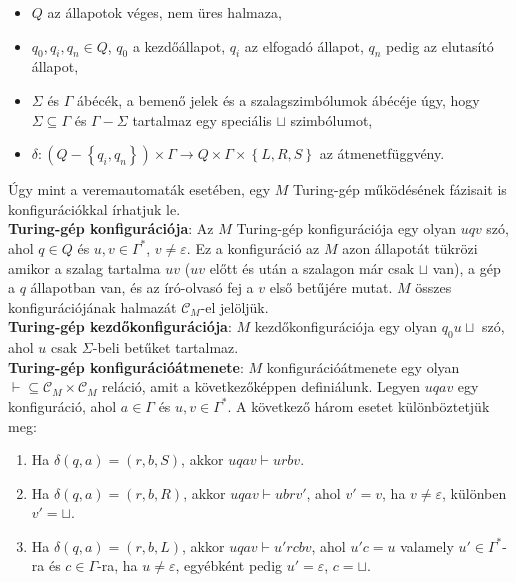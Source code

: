\documentclass[margin=0px]{article}
\begin{document}
	\begin{itemize}
		
		\item	$Q$ az állapotok véges, nem üres halmaza,
		
		\item	$q_{0}, q_{i}, q_{n} \in Q$, $q_{0}$ a kezdőállapot, $q_{i}$ az elfogadó állapot,
		$q_{n}$ pedig az elutasító állapot,
		
		\item	$\Sigma$ és $\Gamma$ ábécék, a bemenő jelek és a szalagszimbólumok ábécéje úgy, hogy
		$\Sigma \subseteq \Gamma$ és $\Gamma - \Sigma$ tartalmaz egy speciális $\sqcup$ szimbólumot,
		
		\item	$\delta : (Q - \left\{q_{i},q_{n}\right\}) \times \Gamma \to Q \times \Gamma \times \left\{L, R, S\right\}$
		az átmenetfüggvény.

	\end{itemize}
	
	Úgy mint a veremautomaták esetében, egy $M$ Turing-gép működésének fázisait	is konfigurációkkal írhatjuk le.\\
	
	\noindent \textbf{Turing-gép konfigurációja}: Az $M$ Turing-gép konfigurációja egy olyan $uqv$ szó, ahol
	$q \in Q$ és $u, v \in \Gamma^{*}$, $v \not = \varepsilon$. Ez a konfiguráció az $M$ azon állapotát tükrözi
	amikor a szalag tartalma $uv$ ($uv$ előtt és után a szalagon már csak $\sqcup$ van), a gép a $q$ állapotban van,
	és az író-olvasó fej a $v$ első betűjére mutat. $M$ összes konfigurációjának halmazát $\mathcal{C}_{M}$-el jelöljük.\\
	
	\noindent \textbf{Turing-gép kezdőkonfigurációja}: $M$ kezdőkonfigurációja egy olyan $q_{0}u\sqcup$ szó, ahol
	$u$ csak $\Sigma$-beli betűket tartalmaz.\\
	
	\noindent \textbf{Turing-gép konfigurációátmenete}: $M$ konfigurációátmenete egy olyan
	$\vdash \subseteq \mathcal{C}_{M} \times \mathcal{C}_{M}$ reláció, amit a következőképpen definiálunk.
	Legyen $uqav$ egy konfiguráció, ahol $a \in \Gamma$ és $u, v \in \Gamma^{*}$. A következő három esetet
	különböztetjük meg:
	
	\begin{enumerate}
		
		\item	Ha $\delta(q,a) = (r, b, S)$, akkor $uqav \vdash urbv$.
		
		\item	Ha $\delta(q,a) = (r, b, R)$, akkor $uqav \vdash ubrv'$, ahol $v' = v$, ha $v \not = \varepsilon$, különben
		$v' = \sqcup$.
		
		\item	Ha $\delta(q,a) = (r, b, L)$, akkor $uqav \vdash u'rcbv$, ahol $u'c = u$ valamely $u' \in \Gamma^{*}$-ra
		és $c \in \Gamma$-ra, ha $u \not = \varepsilon$, egyébként pedig $u' = \varepsilon$, $c = \sqcup$.
	
	\end{enumerate}
	
\end{document}
